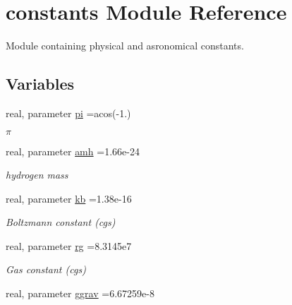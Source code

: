 \hypertarget{namespaceconstants}{}\section{constants Module Reference}
\label{namespaceconstants}


Module containing physical and asronomical constants.  


\subsection*{Variables}
\begin{DoxyCompactItemize}
\item 
\hypertarget{namespaceconstants_a815ad954ef712211ed1b1fdb8be42487}{}real, parameter \hyperlink{namespaceconstants_a815ad954ef712211ed1b1fdb8be42487}{pi} =acos(-\/1.)\label{namespaceconstants_a815ad954ef712211ed1b1fdb8be42487}

\begin{DoxyCompactList}\small\item\em $ \pi $ \end{DoxyCompactList}\item 
\hypertarget{namespaceconstants_aac258d92ad409a5ad7f8748101e932b0}{}real, parameter \hyperlink{namespaceconstants_aac258d92ad409a5ad7f8748101e932b0}{amh} =1.\+66e-\/24\label{namespaceconstants_aac258d92ad409a5ad7f8748101e932b0}

\begin{DoxyCompactList}\small\item\em hydrogen mass \end{DoxyCompactList}\item 
\hypertarget{namespaceconstants_afc7b29a52df069e705256c11de562808}{}real, parameter \hyperlink{namespaceconstants_afc7b29a52df069e705256c11de562808}{kb} =1.\+38e-\/16\label{namespaceconstants_afc7b29a52df069e705256c11de562808}

\begin{DoxyCompactList}\small\item\em Boltzmann constant (cgs) \end{DoxyCompactList}\item 
\hypertarget{namespaceconstants_aab4c0a2b0e8b8cda79e9d683b3e650f6}{}real, parameter \hyperlink{namespaceconstants_aab4c0a2b0e8b8cda79e9d683b3e650f6}{rg} =8.\+3145e7\label{namespaceconstants_aab4c0a2b0e8b8cda79e9d683b3e650f6}

\begin{DoxyCompactList}\small\item\em Gas constant (cgs) \end{DoxyCompactList}\item 
\hypertarget{namespaceconstants_a1e2651b5b314d8b869a9a48b1063f126}{}real, parameter \hyperlink{namespaceconstants_a1e2651b5b314d8b869a9a48b1063f126}{ggrav} =6.\+67259e-\/8\label{namespaceconstants_a1e2651b5b314d8b869a9a48b1063f126}


\end{DoxyCompactItemize}

